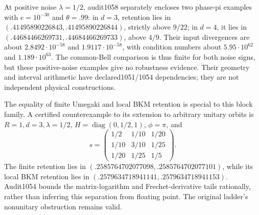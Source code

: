 At positive noise $\lambda=1/2$, audit1058 separately encloses two phase-pi examples with $e=10^{-30}$ and $\theta=.99$: in $d=3$, retention lies in $(.41495890226843,.41495890226844)$, strictly above $9/22$; in $d=4$, it lies in $(.44684466269731,.44684466269733)$, above $4/9$. Their input divergences are about $2.8492\cdot10^{-58}$ and $1.9117\cdot10^{-58}$, with condition numbers about $5.95\cdot10^{62}$ and $1.189\cdot10^{63}$. The common-Bell comparison is thus finite for both noise signs, but these positive-noise examples give no robustness evidence. Their geometry and interval arithmetic have declared1051/1054 dependencies; they are not independent physical constructions.

The equality of finite Umegaki and local BKM retention is special to this block family. A certified counterexample to its extension to arbitrary unitary orbits is $R=1,d=3,\lambda=1/2$, $H=\operatorname{diag}(0,1/2,1)$, $\phi=\pi$, and
\[
 s=\begin{pmatrix}1/2&1/10&1/20\\1/10&3/10&1/25\\1/20&1/25&1/5\end{pmatrix}.
\]
The finite retention lies in $(.2585764702077098,.2585764702077101)$, while its local BKM retention lies in $(.2579634718941141,.2579634718941153)$. Audit1054 bounds the matrix-logarithm and Frechet-derivative tails rationally, rather than inferring this separation from floating point. The original ladder's nonunitary obstruction remains valid.
